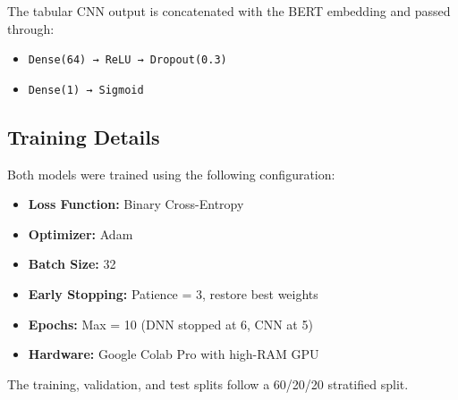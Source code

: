 The tabular CNN output is concatenated with the BERT embedding and passed through:
\begin{itemize}
    \item \texttt{Dense(64) → ReLU → Dropout(0.3)}
    \item \texttt{Dense(1) → Sigmoid}
\end{itemize}

\subsection{Training Details}

Both models were trained using the following configuration:
\begin{itemize}
    \item \textbf{Loss Function:} Binary Cross-Entropy
    \item \textbf{Optimizer:} Adam
    \item \textbf{Batch Size:} 32
    \item \textbf{Early Stopping:} Patience = 3, restore best weights
    \item \textbf{Epochs:} Max = 10 (DNN stopped at 6, CNN at 5)
    \item \textbf{Hardware:} Google Colab Pro with high-RAM GPU
\end{itemize}

The training, validation, and test splits follow a 60/20/20 stratified split.